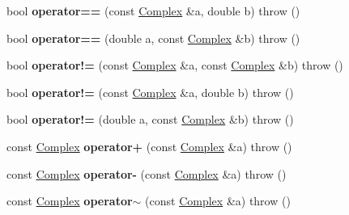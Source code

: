 \begin{DoxyCompactItemize}
bool {\bfseries operator==} (const \hyperlink{classkerbal_1_1math_1_1_complex}{Complex} \&a, double b)  throw ()
\item 
\mbox{\label{namespacekerbal_1_1math_a356295362d037d0886058b1ec04eee56}} 
bool {\bfseries operator==} (double a, const \hyperlink{classkerbal_1_1math_1_1_complex}{Complex} \&b)  throw ()
\item 
\mbox{\label{namespacekerbal_1_1math_a2832f2322c4054f917dd9b6a755bf21b}} 
bool {\bfseries operator!=} (const \hyperlink{classkerbal_1_1math_1_1_complex}{Complex} \&a, const \hyperlink{classkerbal_1_1math_1_1_complex}{Complex} \&b)  throw ()
\item 
\mbox{\label{namespacekerbal_1_1math_a705328738643bd9a51c690262ebc3736}} 
bool {\bfseries operator!=} (const \hyperlink{classkerbal_1_1math_1_1_complex}{Complex} \&a, double b)  throw ()
\item 
\mbox{\label{namespacekerbal_1_1math_a020aab64587cfea2b2d17e9b415d72fc}} 
bool {\bfseries operator!=} (double a, const \hyperlink{classkerbal_1_1math_1_1_complex}{Complex} \&b)  throw ()
\item 
\mbox{\label{namespacekerbal_1_1math_a8e5082f4ba7657f997c4037595257a2a}} 
const \hyperlink{classkerbal_1_1math_1_1_complex}{Complex} {\bfseries operator+} (const \hyperlink{classkerbal_1_1math_1_1_complex}{Complex} \&a)  throw ()
\item 
\mbox{\label{namespacekerbal_1_1math_ab5ab917208506920e564b57772370efb}} 
const \hyperlink{classkerbal_1_1math_1_1_complex}{Complex} {\bfseries operator-\/} (const \hyperlink{classkerbal_1_1math_1_1_complex}{Complex} \&a)  throw ()
\item 
\mbox{\label{namespacekerbal_1_1math_a5fbcc38046913b307f542565d2db8187}} 
const \hyperlink{classkerbal_1_1math_1_1_complex}{Complex} {\bfseries operator$\sim$} (const \hyperlink{classkerbal_1_1math_1_1_complex}{Complex} \&a)  throw ()
\item 
\mbox{\label{namespacekerbal_1_1math_ae94bdc1a872970afd7915c488cc2cc1a}} 

\end{DoxyCompactItemize}
